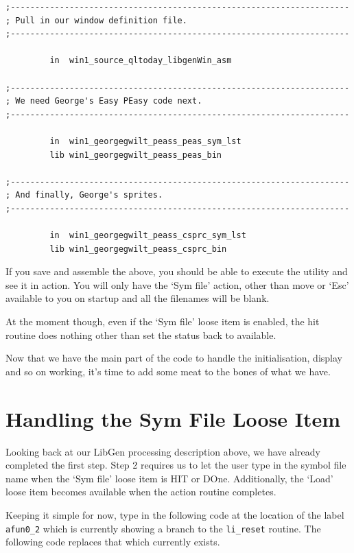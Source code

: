 \begin{lstlisting}[firstnumber=1,]
;---------------------------------------------------------------------
; Pull in our window definition file.
;---------------------------------------------------------------------

         in  win1_source_qltoday_libgenWin_asm

;---------------------------------------------------------------------
; We need George's Easy PEasy code next.
;---------------------------------------------------------------------

         in  win1_georgegwilt_peass_peas_sym_lst
         lib win1_georgegwilt_peass_peas_bin

;---------------------------------------------------------------------
; And finally, George's sprites.
;---------------------------------------------------------------------

         in  win1_georgegwilt_peass_csprc_sym_lst
         lib win1_georgegwilt_peass_csprc_bin
\end{lstlisting}

If you save and assemble the above, you should be able to execute
    the utility and see it in action. You will only have the `Sym file'
    action, other than move or `Esc' available to you on startup and all the
    filenames will be blank.

At the moment though, even if the `Sym file' loose item is enabled,
    the hit routine does nothing other than set the status back to
    available.

Now that we have the main part of the code to handle the
    initialisation, display and so on working, it's time to add some meat to
    the bones of what we have.

\section{Handling the Sym File Loose Item}
\label{ch32-handling-sym-file}%

Looking back at our LibGen processing
    description above, we have already completed the first step. Step 2
    requires us to let the user type in the symbol file name when the `Sym
    file' loose item is HIT or DOne. Additionally, the `Load' loose item
    becomes available when the action routine completes.

Keeping it simple for now, type in the following code at the
    location of the label \texttt{afun0\_2} which is currently
    showing a branch to the \texttt{li\_reset} routine. The
    following code replaces that which currently exists.

